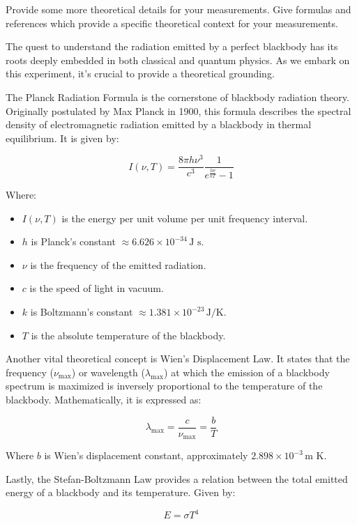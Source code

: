 \documentclass[10pt,letterpaper,onecolumn]{article}
\begin{document}
Provide some more theoretical details for your measurements.
Give formulas and references which provide a specific theoretical
context for your measurements.




The quest to understand the radiation emitted by a perfect blackbody has its roots deeply embedded in both classical and quantum physics. As we embark on this experiment, it's crucial to provide a theoretical grounding.

The Planck Radiation Formula is the cornerstone of blackbody radiation theory. Originally postulated by Max Planck in 1900, this formula describes the spectral density of electromagnetic radiation emitted by a blackbody in thermal equilibrium. It is given by:

\[ I(\nu, T) = \frac{8\pi h\nu^3}{c^3} \frac{1}{e^{\frac{h\nu}{kT}} - 1} \]

Where:
\begin{itemize}
  \item \(I(\nu, T)\) is the energy per unit volume per unit frequency interval.
  \item \(h\) is Planck's constant \(\approx 6.626 \times 10^{-34} \, \text{J s}\).
  \item \(\nu\) is the frequency of the emitted radiation.
  \item \(c\) is the speed of light in vacuum.
  \item \(k\) is Boltzmann's constant \(\approx 1.381 \times 10^{-23} \, \text{J/K}\).
  \item \(T\) is the absolute temperature of the blackbody\cite{planck_1900}.
\end{itemize}

Another vital theoretical concept is Wien's Displacement Law. It states that the frequency (\(\nu_{\text{max}}\)) or wavelength (\(\lambda_{\text{max}}\)) at which the emission of a blackbody spectrum is maximized is inversely proportional to the temperature of the blackbody. Mathematically, it is expressed as:

\[ \lambda_{\text{max}} = \frac{c}{\nu_{\text{max}}} = \frac{b}{T} \]

Where \(b\) is Wien's displacement constant, approximately \(2.898 \times 10^{-3} \, \text{m K}\)\cite{wien_law}.

Lastly, the Stefan-Boltzmann Law provides a relation between the total emitted energy of a blackbody and its temperature. Given by:

\[ E = \sigma T^4 \]
\end{document}
